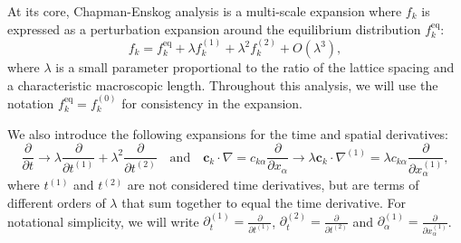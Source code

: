 \documentclass[a4paper, 11pt]{report}
\begin{document}
At its core, Chapman-Enskog analysis is a multi-scale expansion where $f_k$ is expressed as a perturbation expansion around the equilibrium distribution $f_k^{\mathrm{eq}}$:
\begin{equation}
    f_k = f_k^{\mathrm{eq}} + \lambda f_k^{(1)} + \lambda^2 f_k^{(2)} + O(\lambda^3), \label{eq:3.23}
\end{equation}
where $\lambda$ is a small parameter proportional to the ratio of the lattice spacing and a characteristic macroscopic length. Throughout this analysis, we will use the notation $f_k^{\mathrm{eq}} = f_k^{(0)}$ for consistency in the expansion. 

We also introduce the following expansions for the time and spatial derivatives:
\begin{equation}
    \frac{\partial}{\partial t} \rightarrow \lambda \frac{\partial}{\partial t^{(1)}} + \lambda ^2 \frac{\partial}{\partial t^{(2)}} \quad \text{and} \quad %
    \mathbf{c}_k\cdot\nabla = c_{k\alpha}\frac{\partial}{\partial x_\alpha} \rightarrow \lambda\mathbf{c}_k\cdot\nabla^{(1)} = \lambda c_{k\alpha}\frac{\partial}{\partial x_\alpha^{(1)}}, \label{eq:3.24}
\end{equation}
where $t^{(1)}$ and $t^{(2)}$ are not considered time derivatives, but are terms of different orders of $\lambda$ that sum together to equal the time derivative. For notational simplicity, we will write $\partial_t^{(1)} = \frac{\partial}{\partial t^{(1)}}$, $\partial_t^{(2)} = \frac{\partial}{\partial t^{(2)}}$ and $\partial_\alpha^{(1)} = \frac{\partial}{\partial x_\alpha ^{(1)}}$.
\end{document}
